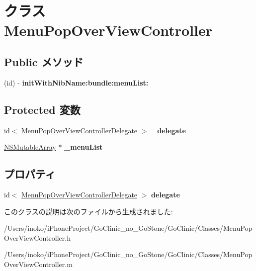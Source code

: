 \hypertarget{interface_menu_pop_over_view_controller}{
\section{クラス MenuPopOverViewController}
\label{interface_menu_pop_over_view_controller}
}
\subsection*{Public メソッド}
\begin{DoxyCompactItemize}
\item 
\hypertarget{interface_menu_pop_over_view_controller_a24370b6d95ae51f762a471789e75bd57}{
(id) -\/ {\bfseries initWithNibName:bundle:menuList:}}
\label{interface_menu_pop_over_view_controller_a24370b6d95ae51f762a471789e75bd57}

\end{DoxyCompactItemize}
\subsection*{Protected 変数}
\begin{DoxyCompactItemize}
\item 
\hypertarget{interface_menu_pop_over_view_controller_adef8413e314705078ba57518c01a8023}{
id$<$ \hyperlink{protocol_menu_pop_over_view_controller_delegate-p}{MenuPopOverViewControllerDelegate} $>$ {\bfseries \_\-delegate}}
\label{interface_menu_pop_over_view_controller_adef8413e314705078ba57518c01a8023}

\item 
\hypertarget{interface_menu_pop_over_view_controller_aa3fd8d3e76a2dd48cc18b148ecc7adb5}{
\hyperlink{class_n_s_mutable_array}{NSMutableArray} $\ast$ {\bfseries \_\-menuList}}
\label{interface_menu_pop_over_view_controller_aa3fd8d3e76a2dd48cc18b148ecc7adb5}

\end{DoxyCompactItemize}
\subsection*{プロパティ}
\begin{DoxyCompactItemize}
\item 
\hypertarget{interface_menu_pop_over_view_controller_a87b0811f9d3b6b80e8ceea03238c14fa}{
id$<$ \hyperlink{protocol_menu_pop_over_view_controller_delegate-p}{MenuPopOverViewControllerDelegate} $>$ {\bfseries delegate}}
\label{interface_menu_pop_over_view_controller_a87b0811f9d3b6b80e8ceea03238c14fa}

\end{DoxyCompactItemize}


このクラスの説明は次のファイルから生成されました:\begin{DoxyCompactItemize}
\item 
/Users/inoko/iPhoneProject/GoClinic\_\-no\_\-GoStone/GoClinic/Classes/MenuPopOverViewController.h\item 
/Users/inoko/iPhoneProject/GoClinic\_\-no\_\-GoStone/GoClinic/Classes/MenuPopOverViewController.m\end{DoxyCompactItemize}
